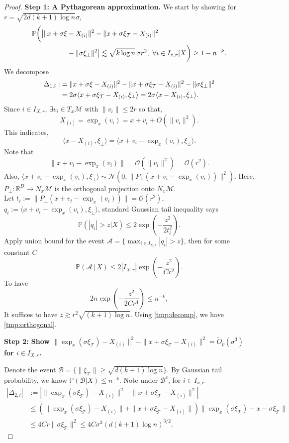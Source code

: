 \documentclass[10pt,a4paper]{amsart}
\def\Prob{{\mathbb P}}
\begin{document}
\begin{proof}
\textbf{Step 1: A Pythagorean approximation.}
We start by showing for $r=\sqrt{2d(k+1)\log n}\sigma,$ 
\begin{align}
\notag
\mathbb{P}\bigg(  \big|\|x + \sigma \xi &- X_{(i)}\|^2 - \|x + \sigma \xi_{\mathcal{T}} - X_{(i)}\|^2\\ &- \|\sigma \xi_\bot\|^2 \big| \lesssim \sqrt{k \log n} \, \sigma r^2,\ 
\forall i \in I_{x,r}|X\bigg) \ge 1 - n^{-k}.
\label{tmp:orthogonal}
\end{align}
We decompose
\begin{align}
\notag
\Delta_{1,i}:&=\|x + \sigma \xi - X_{(i)}\|^2 - \|x + \sigma \xi_{\mathcal{T}} - X_{(i)}\|^2 - \|\sigma \xi_\bot\|^2 \\
\label{tmp:decomp}
&= 2 \sigma \langle x + \sigma \xi_{\mathcal{T}} - X_{(i)}, \xi_\bot \rangle  = 2 \sigma \langle x - X_{(i)}, \xi_\bot \rangle.     
\end{align}
Since $i \in I_{X,r}$, $\exists v_i \in T_x \mathcal{M}$ with $\|v_i\|\leq 2r$ so that,  
\[
X_{(i)} = \exp_x(v_i) = x + v_i + O(\|v_i\|^2).
\]
This indicates, 
\[
\langle x - X_{(i)}, \xi_\bot \rangle = \langle x + v_i - \exp_x(v_i), \xi_\bot \rangle.
\]
Note that
\[
\|x + v_i - \exp_x(v_i)\| = \mathcal{O}(\|v_i\|^2) = \mathcal{O}(r^2).
\]
Also, $\langle x + v_i - \exp_x(v_i), \xi_\bot \rangle \sim \mathcal{N}(0, \|P_\bot(x + v_i - \exp_x(v_i))\|^2)$. Here, $P_\bot: \mathbb{R}^D \to N_x \mathcal{M}$ is the orthogonal projection onto $N_x \mathcal{M}$.\\

Let $t_i := \|P_\bot(x + v_i - \exp_x(v_i))\| = \mathcal{O}(r^2)$, $q_i := \langle x + v_i - \exp_x(v_i), \xi_\bot \rangle$, standard Gaussian tail inequality says
\[
\mathbb{P}(|q_i| > z|X) \le 2 \exp\left( -\frac{z^2}{2 t_i^2} \right).
\]
Apply union bound for the event $\mathcal{A}=\{\max_{i \in I_{X,r}} |q_i| > z\}$, then for some constant $C$
\[
\mathbb{P}\left( \mathcal{A} \,|\,X\right) \leq 2 |I_{X,r}|\exp\left( -\frac{z^2}{C r^2} \right).
\]
To have 
\[
2 n\exp\left( -\frac{z^2}{2 C r^4} \right) \leq n^{-k},
\]
It suffices to have $z \gtrsim r^2 \sqrt{(k+1) \log n}.$ Using \eqref{tmp:decomp}, we have \eqref{tmp:orthogonal}.


\noindent\textbf{Step 2: Show $\|\exp_x(\sigma \xi_{\mathcal{T}})-X_{(i)}\|^2-\|x+\sigma \xi_{\mathcal{T}}-X_{(i)}\|^2=\widetilde{O}_p(\sigma^3)$ for $i\in I_{X,r}$.} 

Denote the event $\mathcal{B}=\{\|\xi_{\mathcal{T}}\|\geq \sqrt{d(k+1)\log n }\}$. By Gaussian tail probability, we know $\Prob(\mathcal{B}|X)\leq n^{-k}$. Note under $\mathcal{B}^c$, for $i\in I_{x,r}$
\begin{align*}
|\Delta_{2,i}|&:=|\|\exp_x(\sigma \xi_{\mathcal{T}})-X_{(i)}\|^2-\|x+\sigma \xi_{\mathcal{T}}-X_{(i)}\|^2|\\
&\leq (\|\exp_x(\sigma \xi_{\mathcal{T}})-X_{(i)}\|+\|x+\sigma \xi_{\mathcal{T}}-X_{(i)}\|)\|\exp_x(\sigma \xi_{\mathcal{T}})-x-\sigma\xi_{\mathcal{T}}\|\\
&\leq 4Cr\|\sigma \xi_{\mathcal{T}}\|^2\leq 4C \sigma^3 (d(k+1)\log n )^{3/2}. 
\end{align*}





\end{proof}
\end{document}
